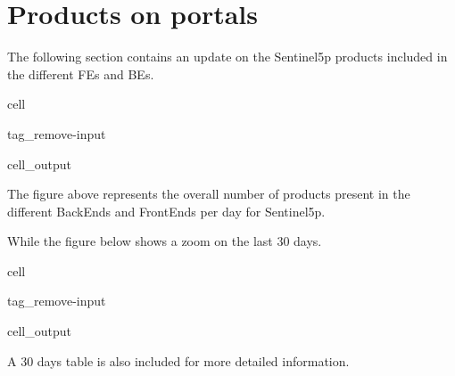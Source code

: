 \documentclass[letterpaper,10pt,english]{jupyterBook}
\begin{document}
\section{Products on portals}
\label{\detokenize{S5p_portals:products-on-portals}}
\sphinxAtStartPar
The following section contains an update on the Sentinel\sphinxhyphen{}5p products included in the different FEs and BEs.

\begin{sphinxuseclass}{cell}
\begin{sphinxuseclass}{tag_remove-input}\begin{sphinxVerbatimOutput}

\begin{sphinxuseclass}{cell_output}
\noindent{}

\end{sphinxuseclass}\end{sphinxVerbatimOutput}

\end{sphinxuseclass}
\end{sphinxuseclass}
\sphinxAtStartPar
The figure above represents the overall number of products present in the different BackEnds and FrontEnds per day for Sentinel\sphinxhyphen{}5p.

\sphinxAtStartPar
While the figure below shows a zoom on the last 30 days.

\begin{sphinxuseclass}{cell}
\begin{sphinxuseclass}{tag_remove-input}\begin{sphinxVerbatimOutput}

\begin{sphinxuseclass}{cell_output}
\noindent{}

\end{sphinxuseclass}\end{sphinxVerbatimOutput}

\end{sphinxuseclass}
\end{sphinxuseclass}
\sphinxAtStartPar
A 30 days table is also included for more detailed information.
\end{document}
